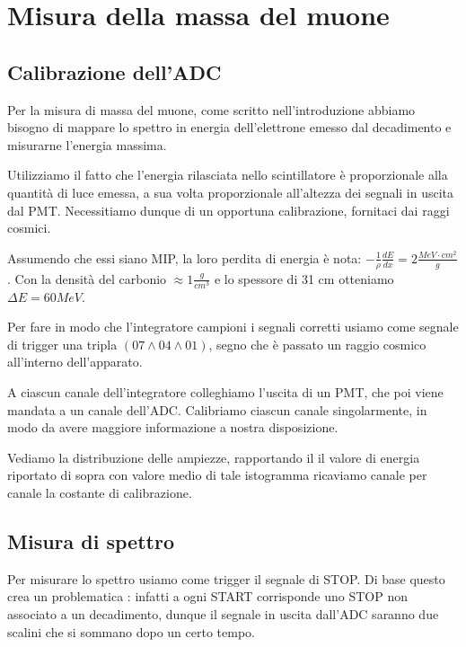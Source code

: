 \documentclass[10pt,a4paper]{article}
\begin{document}
\newpage

\section{Misura della massa del muone}

\subsection{Calibrazione dell'ADC}

Per la misura di massa del muone, come scritto nell'introduzione abbiamo bisogno di mappare lo spettro in energia dell'elettrone emesso dal decadimento e misurarne l'energia massima.

Utilizziamo il fatto che l'energia rilasciata nello scintillatore è proporzionale alla quantità di luce emessa, a sua volta proporzionale all'altezza dei segnali in uscita dal PMT. Necessitiamo dunque di un opportuna calibrazione, fornitaci dai raggi cosmici. 

Assumendo che essi siano MIP, la loro perdita di energia è nota: $-\frac{1}{\rho}\frac{dE}{dx} = 2\frac{MeV \cdot cm^{2}}{g}$. Con la densità del carbonio $\approx 1 \frac{g}{cm^{3}}$ e lo spessore di 31 cm otteniamo $\Delta E  = 60MeV$. 

Per fare in modo che l'integratore campioni i segnali corretti usiamo come segnale di trigger una tripla $(07\land04\land01)$, segno che è passato un raggio cosmico all'interno dell'apparato. 

A ciascun canale dell'integratore colleghiamo l'uscita di un PMT, che poi viene mandata a un canale dell'ADC. Calibriamo ciascun canale singolarmente, in modo da avere maggiore informazione a nostra disposizione. 

Vediamo la distribuzione delle ampiezze, rapportando il il valore di energia riportato di sopra con valore medio di tale istogramma ricaviamo canale per canale la costante di calibrazione. 


\subsection{Misura di spettro}

Per misurare lo spettro usiamo come trigger il segnale di STOP. Di base questo crea un problematica : infatti a ogni START corrisponde uno STOP non associato a un decadimento, dunque il segnale in uscita dall'ADC saranno due scalini che si sommano dopo un certo tempo.
\end{document}
